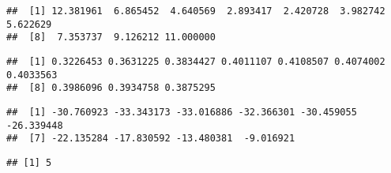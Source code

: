 \documentclass[
]{article}
\newenvironment{Shaded}{\begin{snugshade}}{\end{snugshade}}
\newcommand{\DataTypeTok}[1]{\textcolor[rgb]{0.13,0.29,0.53}{#1}}
\newcommand{\DecValTok}[1]{\textcolor[rgb]{0.00,0.00,0.81}{#1}}
\newcommand{\KeywordTok}[1]{\textcolor[rgb]{0.13,0.29,0.53}{\textbf{#1}}}
\newcommand{\NormalTok}[1]{#1}
\newcommand{\OperatorTok}[1]{\textcolor[rgb]{0.81,0.36,0.00}{\textbf{#1}}}
\newcommand{\StringTok}[1]{\textcolor[rgb]{0.31,0.60,0.02}{#1}}
\begin{document}
\begin{Shaded}
\end{Shaded}

\begin{verbatim}
##  [1] 12.381961  6.865452  4.640569  2.893417  2.420728  3.982742  5.622629
##  [8]  7.353737  9.126212 11.000000
\end{verbatim}

\begin{Shaded}
\end{Shaded}

\begin{verbatim}
##  [1] 0.3226453 0.3631225 0.3834427 0.4011107 0.4108507 0.4074002 0.4033563
##  [8] 0.3986096 0.3934758 0.3875295
\end{verbatim}

\begin{Shaded}
\end{Shaded}

\begin{verbatim}
##  [1] -30.760923 -33.343173 -33.016886 -32.366301 -30.459055 -26.339448
##  [7] -22.135284 -17.830592 -13.480381  -9.016921
\end{verbatim}

\begin{Shaded}
\end{Shaded}

\begin{verbatim}
## [1] 5
\end{verbatim}
\end{document}
